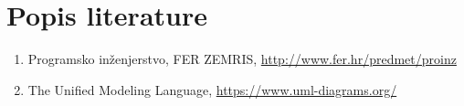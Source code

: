 \chapter*{Popis literature}

		\begin{enumerate}
			
			
			\item  Programsko inženjerstvo, FER ZEMRIS, \url{http://www.fer.hr/predmet/proinz}
			
			\item  The Unified Modeling Language, \url{https://www.uml-diagrams.org/}
			
		\end{enumerate}
		
		 